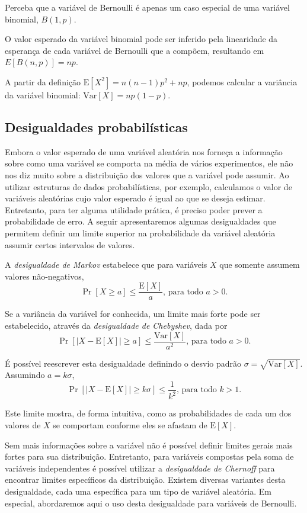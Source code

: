 Perceba que a variável de Bernoulli é apenas um caso especial de uma variável binomial, $B(1, p)$.

O valor esperado da variável binomial pode ser inferido pela linearidade da esperança de cada variável de Bernoulli que a compõem, resultando em $E[B(n, p)] = np$. 

A partir da definição $\text{E}[X^2] = n (n-1) p^2 + np$, podemos calcular a variância da variável binomial: $\text{Var}[X] = np(1-p)$.

\subsection{Desigualdades probabilísticas}

Embora o valor esperado de uma variável aleatória nos forneça a informação sobre como uma variável se comporta na média de vários experimentos, ele não nos diz muito sobre a distribuição dos valores que a variável pode assumir. Ao utilizar estruturas de dados probabilísticas, por exemplo, calculamos o valor de variáveis aleatórias cujo valor esperado é igual ao que se deseja estimar. Entretanto, para ter alguma utilidade prática, é preciso poder prever a probabilidade de erro. A seguir apresentaremos algumas desigualdades que permitem definir um limite superior na probabilidade da variável aleatória assumir certos intervalos de valores.

A \emph{desigualdade de Markov} estabelece que para variáveis $X$ que somente assumem valores não-negativos,
\[
    \Pr[X \geq a] \leq \frac{\text{E}[X]}{a} \text{, para todo } a > 0 \text{.}
\]

Se a variância da variável for conhecida, um limite mais forte pode ser estabelecido, através da \emph{desigualdade de Chebyshev}, dada por
\[
    \Pr[|X - \text{E}[X]| \geq a] \leq \frac{\text{Var}[X]}{a^2} \text{, para todo } a > 0 \text{.}
\]

É possível reescrever esta desigualdade definindo o desvio padrão $\sigma = \sqrt{\text{Var}[X]}$. Assumindo $a = k\sigma$,
\[
    \Pr[|X - \text{E}[X]| \geq k\sigma] \leq \frac{1}{k^2} \text{, para todo } k > 1 \text{.}
\]

Este limite mostra, de forma intuitiva, como as probabilidades de cada um dos valores de $X$ se comportam conforme eles se afastam de $\text{E}[X]$.

Sem mais informações sobre a variável não é possível definir limites gerais mais fortes para sua distribuição. Entretanto, para variáveis compostas pela soma de variáveis independentes é possível utilizar a \emph{desigualdade de Chernoff} para encontrar limites específicos da distribuição. Existem diversas variantes desta desigualdade, cada uma específica para um tipo de variável aleatória. Em especial, abordaremos aqui o uso desta desigualdade para variáveis de Bernoulli.

